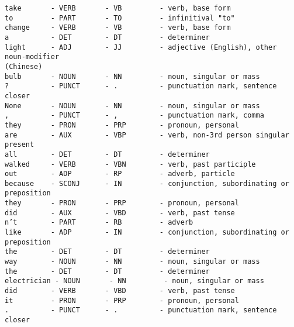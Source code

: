 \begin{Verbatim}[commandchars=\\\{\}]
take       - VERB       - VB         - verb, base form
to         - PART       - TO         - infinitival "to"
change     - VERB       - VB         - verb, base form
a          - DET        - DT         - determiner
light      - ADJ        - JJ         - adjective (English), other noun-modifier
(Chinese)
bulb       - NOUN       - NN         - noun, singular or mass
?          - PUNCT      - .          - punctuation mark, sentence closer
None       - NOUN       - NN         - noun, singular or mass
,          - PUNCT      - ,          - punctuation mark, comma
they       - PRON       - PRP        - pronoun, personal
are        - AUX        - VBP        - verb, non-3rd person singular present
all        - DET        - DT         - determiner
walked     - VERB       - VBN        - verb, past participle
out        - ADP        - RP         - adverb, particle
because    - SCONJ      - IN         - conjunction, subordinating or preposition
they       - PRON       - PRP        - pronoun, personal
did        - AUX        - VBD        - verb, past tense
n’t        - PART       - RB         - adverb
like       - ADP        - IN         - conjunction, subordinating or preposition
the        - DET        - DT         - determiner
way        - NOUN       - NN         - noun, singular or mass
the        - DET        - DT         - determiner
electrician - NOUN       - NN         - noun, singular or mass
did        - VERB       - VBD        - verb, past tense
it         - PRON       - PRP        - pronoun, personal
.          - PUNCT      - .          - punctuation mark, sentence closer
    \end{Verbatim}

